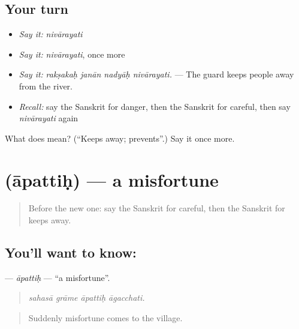 \subsection*{Your turn}
\begin{itemize}
\raggedright
  \item \emph{Say it:} \emph{nivārayati}
  \item \emph{Say it:} \emph{nivārayati}, once more
  \item \emph{Say it:} \emph{rakṣakaḥ janān nadyāḥ nivārayati.} — The guard keeps people away from the river.
  \item \emph{Recall:} say the Sanskrit for danger, then the Sanskrit for careful, then say \emph{nivārayati} again
\end{itemize}

\begin{tcolorbox}[breakable,colback=teal!4,colframe=teal!35!black,title={Before you move on}]
What does  mean? (\textquotedblleft{}Keeps away; prevents\textquotedblright{}.) Say it once more.
\end{tcolorbox}
\section[\texorpdfstring{\sk{आपत्तिः} (āpattiḥ)}{आपत्तिः (āpattiḥ)}]{ (āpattiḥ) — a misfortune}

\label{lesson:SA-C299-apattih}



\begin{quote}
Before the new one: say the Sanskrit for careful, then the Sanskrit for keeps away.
\end{quote}

\subsection*{You'll want to know: }
\textbf{} — \emph{āpattiḥ} — \textquotedblleft{}a misfortune\textquotedblright{}.

\begin{quote}
   
\end{quote}

\begin{quote}
\emph{sahasā grāme āpattiḥ āgacchati.}
\end{quote}

\begin{quote}
Suddenly misfortune comes to the village.
\end{quote}

